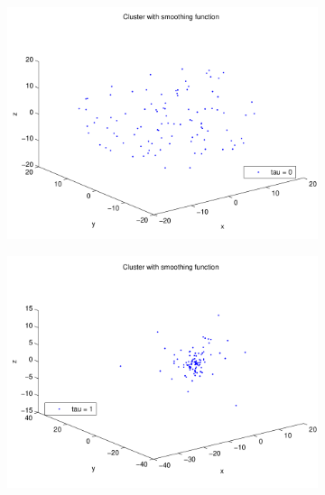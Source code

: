\documentclass[a4paper,12pt, english]{article}
\begin{document}
\begin{figure}[H]
	\centering
        \begin{subfigure}[b]{0.6\textwidth}
        \includegraphics[scale=0.5]{CLUSTER_t0.pdf}
                
		\end{subfigure}
		
		\begin{subfigure}[b]{0.6\textwidth}
        \includegraphics[scale=0.5]{CLUSTER_t1.pdf}
        \end{subfigure}
        

\end{figure}
\end{document}
